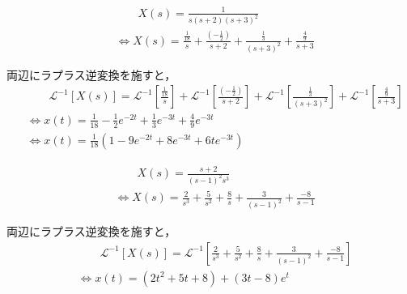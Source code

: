 \documentclass[a4paper,12pt]{article}
\begin{document}
\begin{tcolorbox}[title={ [16] (8) \( X(s)=\frac{ 1 }{ s ( s + 2 ) ( s + 3 )^2 } \) }]
  \vspace{-3mm}
\begin{align*}
    &\qquad X(s) =\frac{ 1 }{ s ( s + 2 ) ( s + 3 )^2 }  \\
    &\Leftrightarrow X(s) 
    = \frac{\frac{1}{18}}{s}
    + \frac{(-\frac{1}{2})}{s + 2} 
    + \frac{\frac{1}{3}}{(s + 3)^2} 
    + \frac{\frac{4}{9}}{s + 3} 
\end{align*}

\quad 両辺にラプラス逆変換を施すと，
\vspace{-3mm}
\begin{align*}
    &\qquad \mathcal{L}^{-1} \left[ X(s) \right] 
    =\mathcal{L}^{-1} \left[ \frac{\frac{1}{18}}{s} \right]
    + \mathcal{L}^{-1} \left[ \frac{(-\frac{1}{2})}{s + 2} \right]
    + \mathcal{L}^{-1} \left[ \frac{\frac{1}{3}}{(s + 3)^2} \right]
    + \mathcal{L}^{-1} \left[ \frac{\frac{4}{9}}{s + 3} \right] \\
    &\Leftrightarrow x(t) = \frac{1}{18} - \frac{1}{2}e^{-2t} + \frac{1}{3}e^{-3t} +\frac{4}{9}e^{-3t}\\
    &\Leftrightarrow x(t) =\frac{1}{18} \left(1 - 9e^{-2t} + 8e^{-3t} +6te^{-3t} \right)
\end{align*}
\end{tcolorbox}
\begin{tcolorbox}[title={ [16] (9) \( X(s)=\frac{ s + 2 }{s^3 ( s - 1 )^2 } \) }]
  \vspace{-3mm}
\begin{align*}
    &\qquad X(s) =\frac{ s + 2 }{ ( s - 1 )^2 s^3 }  \\
    &\Leftrightarrow X(s) 
    = \frac{2}{s^3}
    + \frac{5}{s^2} 
    + \frac{8}{s}
    + \frac{3}{(s - 1)^2}
    + \frac{-8}{s - 1}
\end{align*}

\quad 両辺にラプラス逆変換を施すと，
\vspace{-3mm}
\begin{align*}
    &\qquad \mathcal{L}^{-1} \left[ X(s) \right] 
    =\mathcal{L}^{-1} \left[
        \frac{2}{s^3}
    + \frac{5}{s^2} 
    + \frac{8}{s}
    + \frac{3}{(s - 1)^2}
    + \frac{-8}{s - 1} \right] \\
    &\Leftrightarrow x(t) = \left(2t^2+5t+8\right) + \left(3t-8\right) e^{t}
\end{align*}
\end{tcolorbox}
\end{document}
